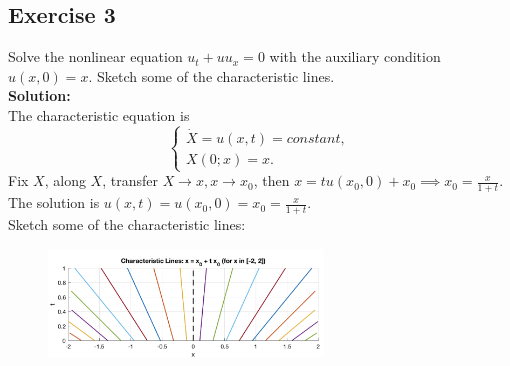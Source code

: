 \documentclass[12pt]{article}%
\begin{document}
\subsection*{Exercise 3}
Solve the nonlinear equation $u_{t}+uu_{x}=0$ with the auxiliary condition $u(x,0)=x$. Sketch some of the characteristic lines.\\
\textbf{Solution:}\\
The characteristic equation is \begin{equation*}
    \begin{cases}
     \dot{X} =u(x,t)=constant, \\
      X(0;x) =x.
    \end{cases}
\end{equation*} %
Fix $X$, along $X$, transfer $X\to x, x\to x_{0}$, then $x=tu(x_{0},0)+x_{0}\implies x_{0}=\frac{x}{1+t}$.\\
The solution is $u(x,t)=u(x_{0},0)=x_{0}=\frac{x}{1+t}.$\\
Sketch some of the characteristic lines:

\begin{figure}[h]
    \centering
    \includegraphics[width=0.65\textwidth]{Graph 1.png} %
    \label{fig:The first graph of characteristic lines}
  \end{figure}
\end{document}

